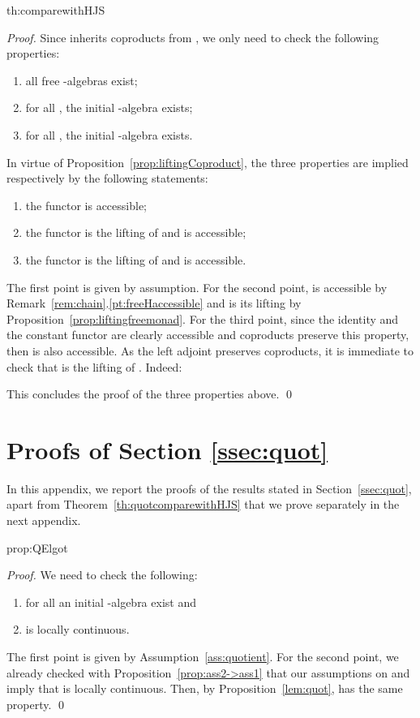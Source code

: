 \documentclass[oribibl,envcountsame,envcountsect,runningheads]{llncs}
\renewcommand{\>}{\rangle}
\newenvironment{theorem_for}[2][\empty]{\bigskip\noindent{\bf
    Theorem~\ref{#2}}\ifthenelse{\equal{#1}{\empty}}{{\bf.}}{ {\bf (#1).}}\it}{\vspace{0.5cm}}
\newenvironment{proposition_for}[2][\empty]{\bigskip\noindent{\bf
    Proposition~\ref{#2}}\ifthenelse{\equal{#1}{\empty}}{{\bf.}}{ {\bf
      (#1).}}\it}{\vspace{0.5cm}}
\begin{document}
\begin{theorem_for}{th:comparewithHJS}
\thcomparewithHJS
\end{theorem_for}
\begin{proof}
Since  inherits coproducts from , we only need to check the following properties:
\begin{enumerate}
  \item all free -algebras exist;
  \item for all , the initial -algebra exists;
  \item for all , the initial -algebra exists.
\end{enumerate}
In virtue of Proposition~\ref{prop:liftingCoproduct}, the three properties are implied respectively by the following statements:
\begin{enumerate}
  \item the functor  is accessible;
  \item the functor  is the lifting of  and  is accessible;
  \item the functor  is the lifting of  and  is accessible.
\end{enumerate}
The first point is given by assumption. For the second point,  is accessible by Remark~\ref{rem:chain}.\ref{pt:freeHaccessible} and  is its lifting by Proposition~\ref{prop:liftingfreemonad}. For the third point, since the identity  and the constant functor  are clearly accessible and coproducts preserve this property, then  is also accessible. As the left adjoint  preserves coproducts, it is immediate to check that  is the lifting of . Indeed:

This concludes the proof of the three properties above. \qed
\end{proof}





\section{Proofs of Section \ref{ssec:quot}}

In this appendix, we report the proofs of the results stated in Section~\ref{ssec:quot}, apart from Theorem~\ref{th:quotcomparewithHJS} that we prove separately in the next appendix.


\begin{proposition_for}{prop:QElgot}
\propQElgot
\end{proposition_for}
\begin{proof} We need to check the following:
 \begin{enumerate}
   \item for all  an initial -algebra exist and
   \item  is locally continuous.
 \end{enumerate}
 The first point is given by Assumption~\ref{ass:quotient}. For the second point, we already checked with Proposition~\ref{prop:ass2->ass1} that our assumptions on  and  imply that  is locally continuous. Then, by Proposition~\ref{lem:quot},  has the same property. \qed
\end{proof}
\end{document}
